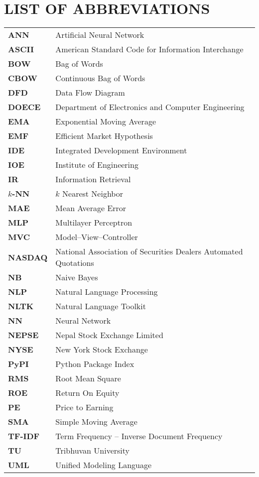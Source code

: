 \section*{LIST OF ABBREVIATIONS}

{
  \renewcommand{\arraystretch}{1.2}

  \begin{longtable}[l]{ll}
    \textbf{ANN} & Artificial Neural Network \\
    \textbf{ASCII} & American Standard Code for Information Interchange \\
    \textbf{BOW} & Bag of Words \\
    \textbf{CBOW} & Continuous Bag of Words \\
    \textbf{DFD} & Data Flow Diagram \\
    \textbf{DOECE} & Department of Electronics and Computer Engineering \\
    \textbf{EMA} & Exponential Moving Average\\
    \textbf{EMF} & Efficient Market Hypothesis\\
    \textbf{IDE} & Integrated Development Environment \\
    \textbf{IOE} & Institute of Engineering \\
    \textbf{IR} & Information Retrieval \\
    \textbf{$k$-NN} & $k$ Nearest Neighbor \\
    \textbf{MAE} & Mean Average Error \\
    \textbf{MLP} & Multilayer Perceptron\\
    \textbf{MVC} & Model--View--Controller \\
    \textbf{NASDAQ} & National Association of Securities Dealers Automated Quotations\\
    \textbf{NB} & Naive Bayes \\
    \textbf{NLP} & Natural Language Processing \\
    \textbf{NLTK} & Natural Language Toolkit \\
    \textbf{NN} & Neural Network \\
    \textbf{NEPSE} & Nepal Stock Exchange Limited \\
    \textbf{NYSE} & New York Stock Exchange \\
    \textbf{PyPI} & Python Package Index \\
    \textbf{RMS} & Root Mean Square \\
    \textbf{ROE} & Return On Equity\\
    \textbf{PE} & Price to Earning\\
    \textbf{SMA} & Simple Moving Average\\
    \textbf{TF-IDF} & Term Frequency -- Inverse Document Frequency \\
    \textbf{TU} & Tribhuvan University \\
    \textbf{UML} & Unified Modeling Language \\
  \end{longtable}
}
